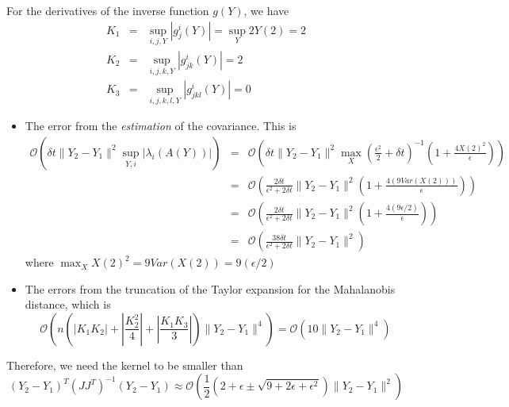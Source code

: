 \documentclass[12pt]{article}
\begin{document}
For the derivatives of the inverse function $g(Y)$, we have
\begin{eqnarray}
K_1 &=& \sup_{i,j,Y} |g_j^i(Y)| = \sup_Y 2 Y(2) = 2 \\
K_2 &=& \sup_{i,j,k,Y} |g_{jk}^i(Y)| = 2 \\
K_3 &=& \sup_{i,j,k,l,Y} |g_{jkl}^i(Y)| = 0
\end{eqnarray}

\begin{itemize}
\item The error from the {\em estimation} of the covariance.
%
This is
\begin{eqnarray}
\mathcal{O} \left( \delta t \| Y_2 - Y_1 \|^2 \sup_{Y, i} |\lambda_i(A(Y))| \right) 
&=& \mathcal{O} \left( \delta t \| Y_2 - Y_1 \| ^2 \max_{X} \left( \frac{\epsilon^2}{2} +  \delta t \right)^{-1} \left( 1 + \frac{4 X(2)^2}{\epsilon} \right) \right)  \\
&=& \mathcal{O} \left( \frac{2 \delta t}{\epsilon^2 + 2 \delta t} \| Y_2 - Y_1 \| ^2 \left( 1 + \frac{4 \left( 9 Var(X(2)) \right)}{\epsilon} \right) \right) \\
&=& \mathcal{O} \left( \frac{2 \delta t}{\epsilon ^2 + 2 \delta t} \| Y_2 - Y_1 \| ^2 \left( 1 + \frac{4 \left( 9 \epsilon /2 \right)}{\epsilon} \right) \right) \\
&=& \mathcal{O} \left( \frac{38 \delta t}{\epsilon ^2 + 2 \delta t} \| Y_2 - Y_1 \| ^2 \right)
\end{eqnarray}
where $\max_{X} X(2)^2  = 9 Var(X(2)) = 9 (\epsilon/2)$


\item The errors from the truncation of the Taylor expansion for the Mahalanobis distance, which is 
$$\mathcal{O} \left(  n \left( \left| K_1 K_2 \right| + \left| \frac{ K_2^2}{4} \right|  + \left| \frac{K_1 K_3}{3} \right|  \right) \| Y_2 - Y_1 \| ^4  \right)
= \mathcal{O} \left( 10 \| Y_2 - Y_1 \| ^4  \right) $$
\end{itemize}

Therefore, we need the kernel to be smaller than 
\begin{equation}
(Y_2 - Y_1)^T (JJ^T)^{-1} (Y_2 - Y_1) 
\approx \mathcal{O} \left(  \frac{1}{2} \left( 2 + \epsilon \pm \sqrt{ 9 + 2 \epsilon + \epsilon^2}\right) \|Y_2 - Y_1 \|^2\right) 
\end{equation}
\end{document}
